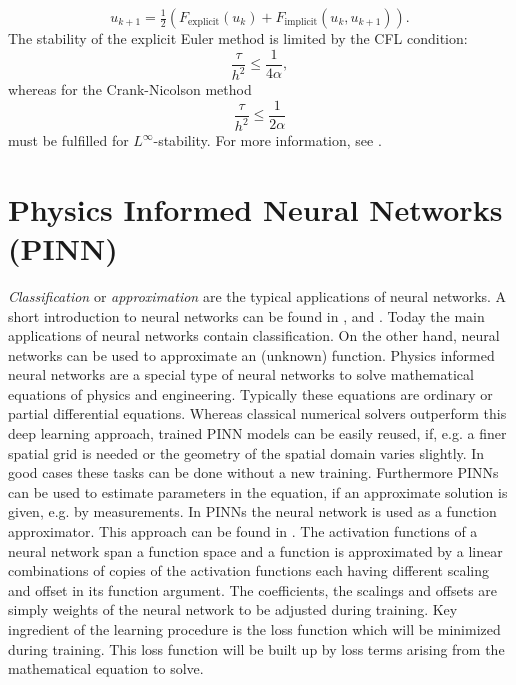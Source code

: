 \documentclass[a4paper,11pt]{article}
\theoremstyle{plain} %
\theoremstyle{definition} %
\theoremstyle{remark} %
\theoremstyle{remark}
\def\uTemp{u}
\begin{document}
\begin{equation*}
\uTemp_{k+1} = \tfrac{1}{2}\left(  F_{\mathrm{explicit}} (\uTemp_k)  + F_{\mathrm{implicit}} (\uTemp_k, \uTemp_{k+1})  \right) .
\end{equation*}
The stability of the explicit Euler method is limited by the CFL condition:
\begin{equation*}
\frac{\tau }{h^2 } \leq \frac{1}{4\alpha }, 
\end{equation*}
whereas for the Crank-Nicolson method
\begin{equation*}
\frac{\tau }{h^2 } \leq \frac{1}{2\alpha }
\end{equation*}
must be fulfilled for $L^\infty $-stability. For more information, see \cite[p 112]{Ernst2015}.

\section{Physics Informed Neural Networks (PINN)}
\emph{Classification} or \emph{approximation} are the typical applications of neural networks. A short introduction to neural networks can be found in \cite[pp. 809]{stoecker1995formeln}, \cite{rey2011neuralnetworks} and \cite{rojas1993neuronale}. Today the main applications of neural networks contain classification. On the other hand, neural networks can be used to approximate an (unknown) function. Physics informed neural networks are a special type of neural networks to solve mathematical equations of physics and engineering. Typically these equations are ordinary or partial differential equations. Whereas classical numerical solvers outperform this deep learning approach, trained PINN models can be easily reused, if, e.g. a finer spatial grid is needed or the geometry of the spatial domain varies slightly. In good cases these tasks can be done without a new training. Furthermore PINNs can be used to estimate parameters in the equation, if an approximate solution is given, e.g. by measurements. In PINNs the neural network is used as a function approximator. This approach can be found in \cite[Section 3.2]{lopez2008}. The activation functions of a neural network span a function space and a function is approximated by a linear combinations of copies of the activation functions each having different scaling and offset in its function argument. The coefficients, the scalings and offsets are simply weights of the neural network to be adjusted during training. Key ingredient of the learning procedure is the loss function which will be minimized during training. This loss function will be built up by loss terms arising from the mathematical equation to solve.
\end{document}

